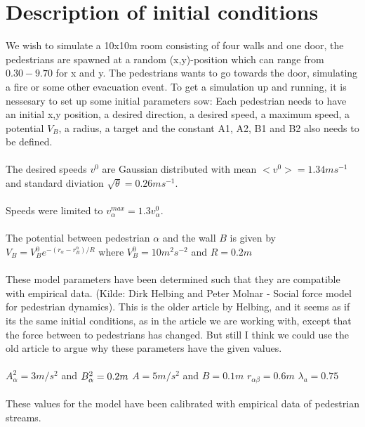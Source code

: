 \documentclass[10pt,a4paper]{article}
\begin{document}
\section{Description of initial conditions}
We wish to simulate a 10x10m room consisting of four walls and one door, the pedestrians are spawned at a random (x,y)-position which can range from $0.30 - 9.70$ for x and y. The pedestrians wants to go towards the door, simulating a fire or some other evacuation event. To get a simulation up and running, it is nessesary to set up some initial parameters sow: Each pedestrian needs to have an initial x,y position, a desired direction, a desired speed, a maximum speed, a potential $V_B$, a radius, a target and the constant A1, A2, B1 and B2 also needs to be defined.\\\\
\noindent
The desired speeds $v^0$ are Gaussian distributed with mean $<v^0> = 1.34ms^{-1}$ and standard diviation $\sqrt{\theta} = 0.26ms^{-1}$. \\\\
Speeds were limited to $v_\alpha^{max}=1.3 v_\alpha^0$.\\\\
\noindent
The potential between pedestrian $\alpha$ and the wall $B$ is given by $V_B=V_B^0 e^{-(r_\alpha - r_B^\alpha )/R}$ where $V_B^0 = 10m^2s^{-2}$ and $R=0.2m$\\\\
\noindent
These model parameters have been determined such that they are compatible with empirical data. (Kilde: Dirk Helbing and Peter Molnar - Social force model for pedestrian dynamics). This is the older article by Helbing, and it seems as if its the same initial conditions, as in the article we are working with, except that the force between to pedestrians has changed. But still I think we could use the old article to argue why these parameters have the given values.\\\\
\noindent
$A^2_\alpha = 3m/s^2$ and $B^2_\alpha = 0.2 m\\$
$A = 5 m/s^2$ and $B=0.1m$
$r_{\alpha \beta} = 0.6m$
$\lambda_a = 0.75$\\\\
\noindent
These values for the model have been calibrated with empirical data of pedestrian streams.
\end{document}
